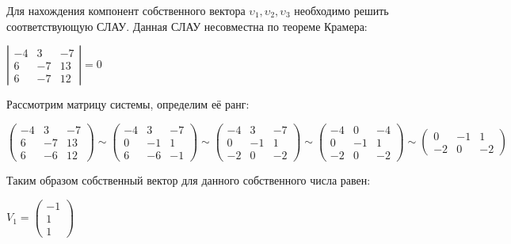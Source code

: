 \documentclass[a4paper, 12pt]{article}
\begin{document}
	\quad Для нахождения компонент собственного вектора $ \upsilon_1, \upsilon_2, \upsilon_3 $ необходимо решить соответствующую СЛАУ. Данная СЛАУ несовместна по теореме Крамера:
	
	\begin{center}
		$  \left|
		\begin{array}{ccc}
			-4 & 3 & -7 \\
			6 & -7 & 13 \\
			6 & -7 & 12
		\end{array}
		\right| = 0 $
	\end{center} 
	
	\quad Рассмотрим матрицу системы, определим её ранг:
	\begin{center}
		$\left(
		\begin{array}{ccc}
			-4 & 3 & -7 \\
			6 & -7 & 13 \\
			6 & -6 & 12
		\end{array}
		\right) \sim 
		\left(
		\begin{array}{ccc}
			-4 & 3 & -7 \\
			0 & -1 & 1 \\
			6 & -6 & -1
		\end{array}
		\right) \sim 
		\left(
		\begin{array}{ccc}
			-4 & 3 & -7 \\ 
			0 & -1 & 1 \\
			-2 & 0 & -2
		\end{array}
		\right) \sim 
		\left(
		\begin{array}{ccc}
			-4 & 0 & -4 \\
			0 & -1 & 1 \\
			-2 & 0 & -2
		\end{array}
		\right) \sim
		\left(
		\begin{array}{ccc}
			0 & -1 & 1 \\
			-2 & 0 & -2
		\end{array}
		\right)$
	\end{center}
	
	
	\quad Таким образом собственный вектор для данного собственного числа равен:
	\begin{center}
		 $V_1 = \left(
		 \begin{array}{c}
		 	-1 \\
		 	1 \\
		 	1
		 \end{array}
		 \right)$
	\end{center}
	
\end{document}

